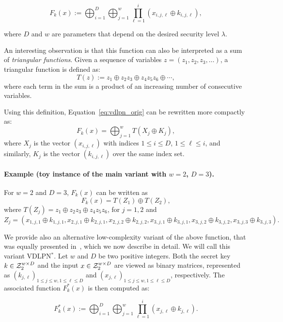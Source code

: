\begin{equation} \label{eq:vdlpn_orig}
    F_k(x) := \bigoplus_{i=1}^D \bigoplus_{j=1}^w \prod_{\ell=1}^i \left(x_{i,j,\ell} \oplus k_{i,j,\ell}\right),
\end{equation}

where $D$ and $w$ are parameters that depend on the desired security level $\lambda$.

An interesting observation is that this function can also be interpreted as a sum of \emph{triangular functions}. Given a sequence of variables $ z = (z_1, z_2, z_3, \dots) $, a triangular function is defined as:
\[
T(z) := z_1 \oplus z_2 z_3 \oplus z_4 z_5 z_6 \oplus \cdots,
\]
where each term in the sum is a product of an increasing number of consecutive variables. 

Using this definition, Equation~\eqref{eq:vdlpn_orig} can be rewritten more compactly as:
\[
F_k(x) = \bigoplus_{j=1}^w T(X_j \oplus K_j),
\]
where $ X_j $ is the vector $(x_{i,j,\ell})$ with indices $ 1 \leq i \leq D $, $ 1 \leq \ell \leq i $, and similarly, $ K_j $ is the vector $(k_{i,j,\ell})$ over the same index set.

\paragraph{Example (toy instance of the main variant with $w = 2$, $D = 3$).}
For $w = 2$ and $D = 3$, $F_k(x)$ can be written as 
\[
F_k(x) = T(Z_1) \oplus T(Z_2),
\]
where $T(Z_j) = z_1 \oplus z_2 z_3 \oplus z_4 z_5 z_6$, for $j = 1, 2$ and
\[
Z_j = \left(
x_{1,j,1} \oplus k_{1,j,1},
x_{2,j,1} \oplus k_{2,j,1}, 
x_{2,j,2} \oplus k_{2,j,2},
x_{3,j,1} \oplus k_{3,j,1}, 
x_{3,j,2} \oplus k_{3,j,2}, 
x_{3,j,3} \oplus k_{3,j,3}
\right).
\]

We provide also an alternative low-complexity variant of the above function, that was equally presented in~\cite{vdlpn}, which we now describe in detail. We will call this variant {\sf VDLPN}$^*$. Let $w$ and $D$ be two positive integers. Both the secret key $k \in \mathcal{Z}_2^{w \times D}$ and the input $x \in \mathcal{Z}_2^{w \times D}$ are viewed as binary matrices, represented as $(k_{j,\ell})_{1 \leq j \leq w, 1 \leq \ell \leq D}$ and $(x_{j,\ell})_{1 \leq j \leq w, 1 \leq \ell \leq D}$, respectively. The associated function $F^*_k(x)$ is then computed as: 

\begin{equation} \label{eq:vdlpn_agg}
    F^*_k(x) := \bigoplus_{i=1}^D \bigoplus_{j=1}^w\prod_{\ell=1}^i (x_{j,\ell} \oplus k_{j,\ell}).
\end{equation}

